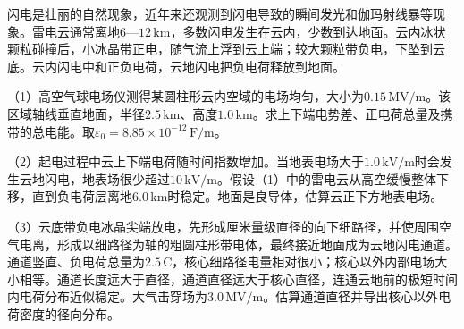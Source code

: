 \documentclass[12pt,a4paper,fontset=fandol]{ctexart}
\begin{document}
闪电是壮丽的自然现象，近年来还观测到闪电导致的瞬间发光和伽玛射线暴等现象。雷电云通常离地\(6\)---\(12\,\mathrm{km}\)，多数闪电发生在云内，少数到达地面。云内冰状颗粒碰撞后，小冰晶带正电，随气流上浮到云上端；较大颗粒带负电，下坠到云底。云内闪电中和正负电荷，云地闪电把负电荷释放到地面。

\begin{center}
\begin{minipage}{\linewidth}
\centering\begingroup{}
\ifdim\wd\diagrambox>.88\linewidth
\sbox{\diagrambox}{\resizebox{.88\linewidth}{!}{\usebox{\diagrambox}}}\fi
\ifdim\ht\diagrambox>.38\textheight
\resizebox{!}{.38\textheight}{\usebox{\diagrambox}}
\else\usebox{\diagrambox}\fi
\par{}\endgroup\end{minipage}\end{center}

（1）高空气球电场仪测得某圆柱形云内空域的电场均匀，大小为\(0.15\,\mathrm{MV/m}\)。该区域轴线垂直地面，半径\(2.5\,\mathrm{km}\)、高度\(1.0\,\mathrm{km}\)。求上下端电势差、正电荷总量及携带的总电能。取\(\varepsilon_0=8.85\times10^{-12}\,\mathrm{F/m}\)。

（2）起电过程中云上下端电荷随时间指数增加。当地表电场大于\(1.0\,\mathrm{kV/m}\)时会发生云地闪电，地表场很少超过\(10\,\mathrm{kV/m}\)。假设（1）中的雷电云从高空缓慢整体下移，直到负电荷层离地\(6.0\,\mathrm{km}\)时稳定。地面是良导体，估算云正下方地表电场。

（3）云底带负电冰晶尖端放电，先形成厘米量级直径的向下细路径，并使周围空气电离，形成以细路径为轴的粗圆柱形带电体，最终接近地面成为云地闪电通道。通道竖直、负电荷总量为\(2.5\,\mathrm C\)，核心细路径电量相对很小；核心以外内部电场大小相等。通道长度远大于直径，通道直径远大于核心直径，连通云地前的极短时间内电荷分布近似稳定。大气击穿场为\(3.0\,\mathrm{MV/m}\)。估算通道直径并导出核心以外电荷密度的径向分布。
\end{document}
